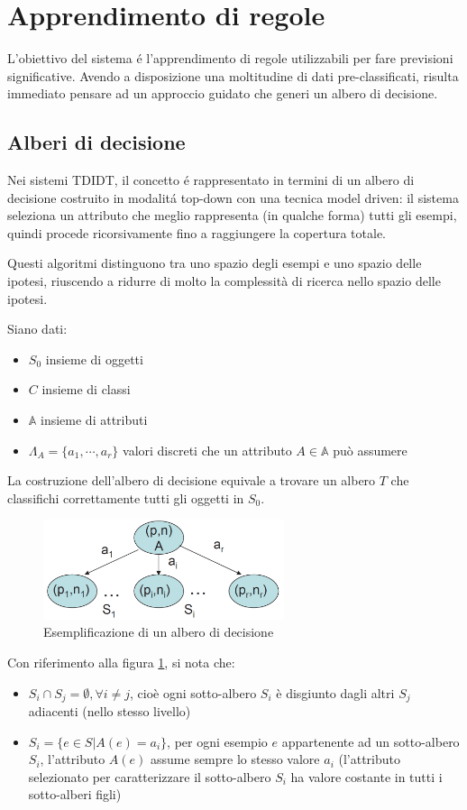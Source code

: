 \documentclass[preprint]{acm_proc_article-sp}
\begin{document}
\section{Apprendimento di regole}
L'obiettivo del sistema \'e l'apprendimento di regole utilizzabili per fare previsioni significative. Avendo a disposizione una moltitudine di dati pre-classificati, risulta immediato pensare ad un approccio guidato che generi un albero di decisione.

\subsection{Alberi di decisione}
Nei sistemi TDIDT, il concetto \'e rappresentato in termini di un albero di decisione costruito in modalit\'a top-down con una tecnica model driven: il sistema seleziona un attributo che meglio rappresenta (in qualche forma) tutti gli esempi, quindi procede ricorsivamente fino a raggiungere la copertura totale.

Questi algoritmi distinguono tra uno spazio degli esempi e uno spazio delle ipotesi, riuscendo a ridurre di molto la complessità di ricerca nello spazio delle ipotesi.

Siano dati:
\begin{itemize}
\item $S_0$ insieme di oggetti
\item $C$ insieme di classi
\item $\mathbb{A}$ insieme di attributi
\item $\Lambda_A=\lbrace a_1,\cdots,a_r \rbrace$ valori discreti che un attributo $A \in \mathbb{A}$ può assumere
\end{itemize}
La costruzione dell'albero di decisione equivale a trovare un albero $T$ che classifichi correttamente tutti gli oggetti in $S_0$.

\begin{figure}[!htb]
\centering
\includegraphics[width=200pt]{figures/decision-tree.png}
\caption{Esemplificazione di un albero di decisione}
\label{fig:albero-decisione}
\end{figure}

Con riferimento alla figura \ref{fig:albero-decisione}, si nota che:
\begin{itemize}
\item $S_i \cap S_j = \emptyset, \forall i \neq j$, cioè ogni sotto-albero $S_i$ è disgiunto dagli altri $S_j$ adiacenti (nello stesso livello)
\item $S_i= \lbrace e \in S | A(e) = a_i \rbrace$, per ogni esempio $e$ appartenente ad un sotto-albero $S_i$, l'attributo $A(e)$ assume sempre lo stesso valore $a_i$ (l'attributo selezionato per caratterizzare il sotto-albero $S_i$ ha valore costante in tutti i sotto-alberi figli)
\end{itemize}
\end{document}
